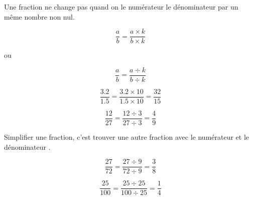 \begin{myprop}
	Une fraction ne change pas quand on  le numérateur  le dénominateur par un même nombre non nul.
	
	\begin{multicols}{3}
		\begin{equation*}
		\dfrac{a}{b} = \dfrac{a \times k}{b \times k} 
		\end{equation*}
		
		 \begin{center}
		 	ou
		 \end{center}
		
		\begin{equation*}
		\dfrac{a}{b} = \dfrac{a \div k}{b \div k} 
		\end{equation*}	
	\end{multicols}	
	
\end{myprop}

\begin{myex}
	
	\begin{multicols}{2}
		
	\begin{equation*}
		\dfrac{\num{3.2}}{\num{1.5}} = \dfrac{\num{3.2} \times 10 }{\num{1.5} \times 10 } = \dfrac{\num{32}}{\num{15}}
	\end{equation*}
	
	
	\begin{equation*}
		\dfrac{\num{12}}{\num{27}} = \dfrac{\num{12} \div 3 }{\num{27} \div 3 } = \dfrac{\num{4}}{\num{9}} 
	\end{equation*}
	\end{multicols}
\end{myex}

\begin{mydef}
	Simplifier une fraction, c'est trouver une autre fraction  avec le numérateur et le dénominateur .
\end{mydef}

\begin{myex}
	\begin{multicols}{2}
		\begin{equation*}
			\dfrac{\num{27}}{\num{72}} = \dfrac{\num{27} \div 9 }{\num{72} \div 9 } = \dfrac{\num{3}}{\num{8}} 
		\end{equation*}	
	
		\begin{equation*}
			\dfrac{\num{25}}{\num{100}} = \dfrac{\num{25} \div 25 }{\num{100} \div 25 } = \dfrac{\num{1}}{\num{4}} 
		\end{equation*}	
	\end{multicols}
\end{myex}


